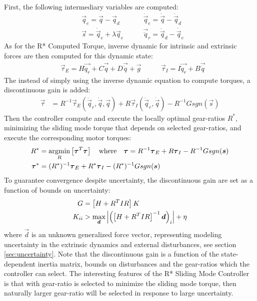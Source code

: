 First, the following intermediary variables are computed:
%
\begin{align}
	&\vec{q}_e        = \vec{q}          -  \vec{q}_d   \quad\quad
	&\dot{\vec{q}}_e  = \dot{\vec{q}}    -  \dot{\vec{q}}_d \\
	&\vec{s}          = \dot{\vec{q}}_e  +  \lambda \vec{q}_e \quad\quad
  &\vec{\ddot{q}}_r = \ddot{\vec{q}}_d -  \dot{\vec{q}}_e 
 \label{eq:slidingvar}
\end{align}
%
As for the R* Computed Torque, inverse dynamic for intrinsic and extrinsic forces are then computed for this dynamic state:
%
\begin{align}
	&\vec{\tau}_{E} = H \vec{ \ddot{q}_r } + C\vec{ \dot{q} } + D \vec{ \dot{q} } + \vec{ g } \quad\quad
	&\vec{\tau}_{I} = I \vec{ \ddot{q}_r } + B \vec{ \dot{q} } 
\end{align}
%
The instead of simply using the inverse dynamic equation to compute torques, a discontinuous gain is added:
%
\begin{align}
	\vec{\tau} &=  R^{-1} 
	\vec{\tau}_{E}(\ddot{\vec{q}}_r,\dot{\vec{q}},\vec{q}) 
	+ R 
	\vec{\tau}_{I}(\ddot{\vec{q}}_r,\dot{\vec{q}})
  - R^{-1} G sgn( \vec{s} ) 
 \label{eq:slidingctl}
\end{align}
%
Then the controller compute and execute the locally optimal gear-ratios $R^*$, minimizing the sliding mode torque that depends on selected gear-ratios, and execute the corresponding motor torques: 
%
\begin{align}
R^{*} &= \operatornamewithlimits{argmin}\limits_{R} \left[ \vec{\tau}^T\vec{\tau}  \right] \quad\text{where}\quad \vec{\tau} = R^{-1} \vec{\tau}_{E} + R \vec{\tau}_{I} - R^{-1} G sgn( \vec{s} ) 
\\
\vec{\tau}^* &= (R^*)^{-1} \vec{\tau}_{E} + R^* \vec{\tau}_{I} - (R^*)^{-1} G sgn( \vec{s} ) 
\end{align} 
%
To guarantee convergence despite uncertainty, the discontinuous gain are set as a function of bounds on uncertainty:
%
\begin{align}
	G &= \left[ H + R^T I R \right] K \\ K_{ii} &> \operatornamewithlimits{max}\limits_{\vec{d}} \left| \left(  \left[ H + R^T I R \right]^{-1} \vec{d} \right)_{i} \right| + \eta
\end{align}
%
where $\vec{d}$ is an unknown generalized force vector, representing modeling uncertainty in the extrinsic dynamics and external disturbances, see section \ref{sec:uncertainty}. Note that the discontinuous gain is a function of the state-dependent inertia matrix, bounds on disturbances and the gear-ratios which the controller can select. The interesting features of the R* Sliding Mode Controller is that with gear-ratio is selected to minimize the sliding mode torque, then naturally larger gear-ratio  will be selected in response to large uncertainty. 

